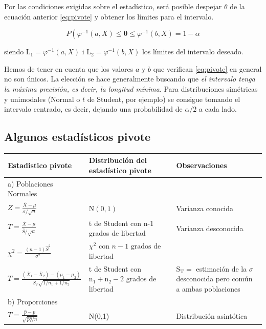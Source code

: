 \documentclass[
]{article}
\begin{document}
Por las condiciones exigidas sobre el estadístico, será posible despejar \(\theta\) de la ecuación anterior \eqref{eq:pivote} y obtener los límites para el intervalo.

\[
P\left(\varphi^{-1}(a, X) \leq \boldsymbol{\theta} \leq \varphi^{-1}(b, X)=1-\alpha\right.
\]

siendo \(\mathrm{L}_{1}=\varphi^{-1}(a, X)\) i \(\mathrm{L}_{2}=\varphi^{-1}(b, X)\) los límites del intervalo deseado.

Hemos de tener en cuenta que los valores \(a\) y \(b\) que verifican \eqref{eq:pivote} en general no son únicos. La elección se hace generalmente buscando que \emph{el intervalo tenga la máxima precisión, es decir, la longitud mínima}. Para distribuciones simétricas y unimodales (Normal o \(t\) de Student, por ejemplo) se consigue tomando el intervalo centrado, es decir, dejando una probabilidad de \(\alpha / 2\) a cada lado.

\subsection{Algunos estadísticos pivote}\label{algunos-estaduxedsticos-pivote}

\begin{longtable}[]{@{}
  >{\centering\arraybackslash}p{}
  >{\centering\arraybackslash}p{}
  >{\centering\arraybackslash}p{}@{}}
\toprule\noalign{}
\begin{minipage}[b]{\linewidth}\centering
Estadistico pivote
\end{minipage} & \begin{minipage}[b]{\linewidth}\centering
Distribución del estadístico pivote
\end{minipage} & \begin{minipage}[b]{\linewidth}\centering
Observaciones
\end{minipage} \\
\midrule\noalign{}
\endhead
\bottomrule\noalign{}
\endlastfoot
a) Poblaciones Normales & & \\
\(Z=\frac{\bar{X}-\mu}{\sigma / \sqrt{n}}\) & \(\mathrm{N}(0,1)\) & Varianza conocida \\
\(T=\frac{\bar{X}-\mu}{\hat{S} / \sqrt{n}}\) & t de Student con n-1 grados de libertad & Varianza desconocida \\
\(\chi^{2}=\frac{(n-1) \hat{S}^{2}}{\sigma^{2}}\) & \(\chi^{2} \text { con } n-1 \text { grados de }\) libertad & \\
\(T=\frac{\left(\bar{X}_{1}-\bar{X}_{2}\right)-\left(\mu_{1}-\mu_{2}\right)}{S_{T} \sqrt{1 / n_{1}+1 / n_{2}}}\) & t de Student con \(\mathrm{n}_{1}+\mathrm{n}_{2}-2\) grados de libertad & \(\mathrm{S}_{\mathrm{T}}=\) estimación de la \(\sigma\) desconocida pero común a ambas poblaciones \\
b) Proporciones & & \\
\(T=\frac{\hat{p}-p}{\sqrt{\hat{p} \hat{q} / n}}\) & N(0,1) & Distribución asintótica \\
\end{longtable}
\end{document}
